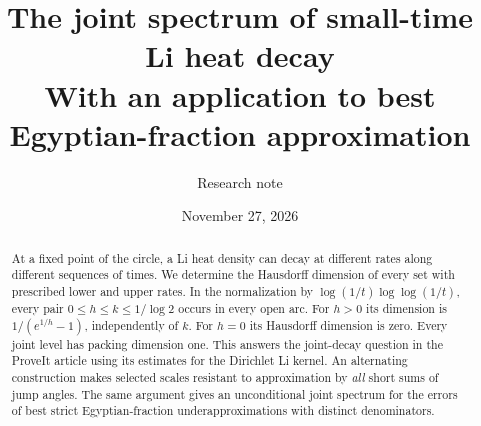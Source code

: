 \documentclass[11pt]{article}
\title{The joint spectrum of small-time Li heat decay\\[3pt]
\large With an application to best Egyptian-fraction approximation}
\author{Research note}
\date{November 27, 2026}
\begin{document}
\maketitle
\begin{abstract}
At a fixed point of the circle, a Li heat density can decay at different rates along different sequences of times. We determine the Hausdorff dimension of every set with prescribed lower and upper rates. In the normalization by $\log(1/t)\log\log(1/t)$, every pair $0\le h\le k\le 1/\log2$ occurs in every open arc. For $h>0$ its dimension is $1/(e^{1/h}-1)$, independently of $k$. For $h=0$ its Hausdorff dimension is zero. Every joint level has packing dimension one. This answers the joint-decay question in the ProveIt article using its estimates for the Dirichlet Li kernel. An alternating construction makes selected scales resistant to approximation by \emph{all} short sums of jump angles. The same argument gives an unconditional joint spectrum for the errors of best strict Egyptian-fraction underapproximations with distinct denominators.
\end{abstract}
\end{document}
